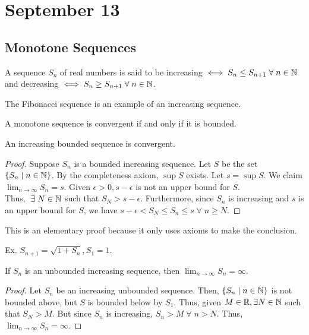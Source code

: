\section{September 13}

\subsection{Monotone Sequences}
\begin{definition}
    A sequence $S_n$ of real numbers is said to be increasing $\iff S_n \leq S_{n+1} \;\forall\; n \in \mathbb{N}$ and decreasing $\iff S_n \geq S_{n+1} \;\forall\; n \in \mathbb{N}$.
\end{definition}
\begin{remark}
    The Fibonacci sequence is an example of an increasing sequence.
\end{remark}

\begin{definition}
    A monotone sequence is convergent if and only if it is bounded.
\end{definition}

\begin{theorem}
    An increasing bounded sequence is convergent.
\end{theorem}
\begin{proof}
    Suppose $S_n$ is a bounded increasing sequence. Let $S$ be the set $\{S_n \mid n \in \mathbb{N}\}$. By the completeness axiom, $\sup S$ exists. Let $s = \sup S$. We claim $\lim_{n \to \infty} S_n = s$. Given $\epsilon > 0, s - \epsilon$ is not an upper bound for $S$. \\ Thus, $\;\exists\; N \in \mathbb{N}$ such that $S_N > s - \epsilon$. Furthermore, since $S_n$ is increasing and $s$ is an upper bound for $S$, we have $s - \epsilon < S_N \leq S_n \leq s \;\forall\; n \geq N$.
\end{proof}
\begin{remark}
    This is an elementary proof because it only uses axioms to make the conclusion.
\end{remark}
Ex. $S_{n+1} = \sqrt{1 + S_n}, S_1 = 1$.


\begin{theorem}
    If $S_n$ is an unbounded increasing sequence, then $\lim_{n \to \infty} S_n = \infty$.
\end{theorem}
\begin{proof}
    Let $S_n$ be an increasing unbounded sequence. Then, $\{S_n \mid n \in \mathbb{N}\}$ is not bounded above, but $S$ is bounded below by $S_1$. Thus, given $M \in \mathbb{R}, \exists N \in \mathbb{N}$ such that $S_N > M$. But since $S_n$ is increasing, $S_n > M \;\forall\; n > N$. Thus, $\lim_{n \to \infty} S_n = \infty$.
\end{proof}
